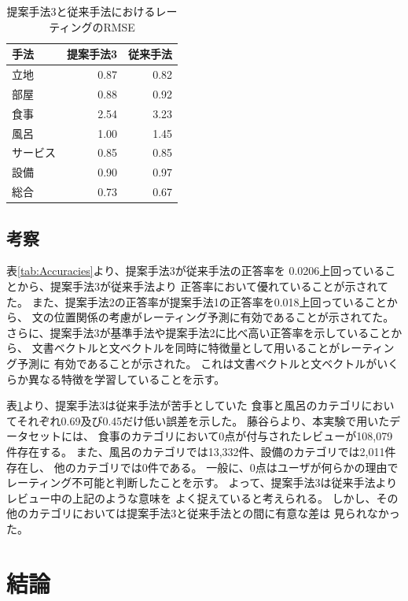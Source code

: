 \documentclass[twocolumn,a4paper]{ltjarticle}
\begin{document}
\begin{table}
  \caption{提案手法3と従来手法\cite{fujitani15}におけるレーティングのRMSE}
  \centering
  \begin{tabular}{l | r r} \label{tab:RMSEs}
    手法 & 提案手法3 & 従来手法\cite{fujitani15} \\
    \hline
    立地      & 0.87 & 0.82 \\
    部屋      & 0.88 & 0.92 \\
    食事      & 2.54 & 3.23 \\
    風呂      & 1.00 & 1.45 \\
    サービス  & 0.85 & 0.85 \\
    設備      & 0.90 & 0.97 \\
    総合      & 0.73 & 0.67 \\
  \end{tabular}
\end{table}


\subsection{考察}

表\ref{tab:Accuracies}より、提案手法3が従来手法\cite{fujitani15}の正答率を
0.0206上回っていることから、提案手法3が従来手法\cite{fujitani15}より
正答率において優れていることが示されてた。
また、提案手法2の正答率が提案手法1の正答率を0.018上回っていることから、
文の位置関係の考慮がレーティング予測に有効であることが示されてた。
さらに、提案手法3が基準手法や提案手法2に比べ高い正答率を示していることから、
文書ベクトルと文ベクトルを同時に特徴量として用いることがレーティング予測に
有効であることが示された。
これは文書ベクトルと文ベクトルがいくらか異なる特徴を学習していることを示す。

表\ref{tab:RMSEs}より、提案手法3は従来手法\cite{fujitani15}が苦手としていた
食事と風呂のカテゴリにおいてそれぞれ0.69及び0.45だけ低い誤差を示した。
藤谷ら\cite{fujitani15}より、本実験で用いたデータセットには、
食事のカテゴリにおいて0点が付与されたレビューが108,079件存在する。
また、風呂のカテゴリでは13,332件、設備のカテゴリでは2,011件存在し、
他のカテゴリでは0件である。
一般に、0点はユーザが何らかの理由でレーティング不可能と判断したことを示す。
よって、提案手法3は従来手法\cite{fujitani15}よりレビュー中の上記のような意味を
よく捉えていると考えられる。
しかし、その他のカテゴリにおいては提案手法3と従来手法との間に有意な差は
見られなかった。


\section{結論}
\end{document}
